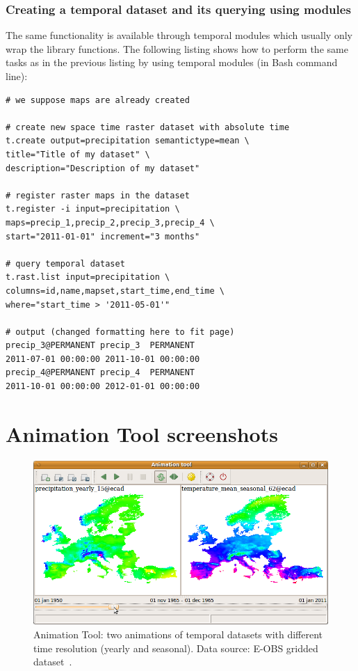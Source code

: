 \documentclass[a4paper,12pt,oneside]{book}
\newcommand{\at}{Animation Tool\xspace}
\begin{document}
\subsection*{Creating a temporal dataset and its querying using modules}
The same functionality is available through temporal modules
which usually only wrap the library functions.
The following listing shows how to perform the same tasks as in the previous
listing by using temporal modules (in Bash command line):
\begin{small}
\begin{lstlisting}[style=python]
# we suppose maps are already created

# create new space time raster dataset with absolute time
t.create output=precipitation semantictype=mean \
title="Title of my dataset" \
description="Description of my dataset"

# register raster maps in the dataset
t.register -i input=precipitation \
maps=precip_1,precip_2,precip_3,precip_4 \
start="2011-01-01" increment="3 months"

# query temporal dataset
t.rast.list input=precipitation \
columns=id,name,mapset,start_time,end_time \
where="start_time > '2011-05-01'"

# output (changed formatting here to fit page)
precip_3@PERMANENT precip_3  PERMANENT
2011-07-01 00:00:00 2011-10-01 00:00:00
precip_4@PERMANENT precip_4  PERMANENT
2011-10-01 00:00:00 2012-01-01 00:00:00

\end{lstlisting}
\end{small}

\chapter{\at screenshots}
\label{appdx:animation}
\begin{figure}[h!]
  \centering
  \includegraphics{./images/animation_tool1.png}
  \caption[\at: two animations of temporal datasets with different time resolution (yearly and seasonal)]
  {\at: two animations of temporal datasets with different time resolution (yearly and seasonal).
  Data source: E-OBS gridded dataset~\cite{haylock2008european}.}
  \label{fig:anim2D}
\end{figure}
\end{document}
